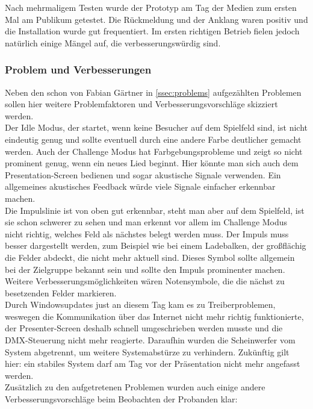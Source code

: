 \label{ssec:Praxis}

Nach mehrmaligem Testen wurde der Prototyp am Tag der Medien zum ersten Mal am Publikum getestet. Die Rückmeldung und der Anklang waren positiv und die Installation wurde gut frequentiert. Im ersten richtigen Betrieb fielen jedoch natürlich einige Mängel auf, die verbesserungswürdig sind.  
 
\subsubsection{Problem und Verbesserungen}
Neben den schon von Fabian Gärtner in \autoref{ssec:problems} aufgezählten Problemen sollen hier weitere Problemfaktoren und Verbesserungsvorschläge skizziert werden.\\
Der Idle Modus, der startet, wenn keine Besucher auf dem Spielfeld sind, ist nicht eindeutig genug und sollte eventuell durch eine andere Farbe deutlicher gemacht werden. Auch der Challenge Modus hat Farbgebungsprobleme und zeigt so nicht prominent genug, wenn ein neues Lied beginnt. Hier könnte man sich auch dem Presentation-Screen bedienen und sogar akustische Signale verwenden. Ein allgemeines akustisches Feedback würde viele Signale einfacher erkennbar machen.\\
Die Impulslinie ist von oben gut erkennbar, steht man aber auf dem Spielfeld, ist sie schon schwerer zu sehen und man erkennt vor allem im Challenge Modus nicht richtig, welches Feld als nächstes belegt werden muss. Der Impuls muss besser dargestellt werden, zum Beispiel wie bei einem Ladebalken, der großflächig die Felder abdeckt, die nicht mehr aktuell sind. Dieses Symbol sollte allgemein bei der Zielgruppe bekannt sein und sollte den Impuls prominenter machen. Weitere Verbesserungsmöglichkeiten wären Notensymbole, die die nächst zu besetzenden Felder markieren.\\ 
Durch Windowsupdates just an diesem Tag kam es zu Treiberproblemen, weswegen die Kommunikation über das Internet nicht mehr richtig funktionierte, der Presenter-Screen deshalb schnell umgeschrieben werden musste und die DMX-Steuerung nicht mehr reagierte. Daraufhin wurden die Scheinwerfer vom System abgetrennt, um weitere Systemabstürze zu verhindern. Zukünftig gilt hier: ein stabiles System darf am Tag vor der Präsentation nicht mehr angefasst werden.\\
Zusätzlich zu den aufgetretenen Problemen wurden auch einige andere Verbesserungsvorschläge beim Beobachten der Probanden klar:\\
